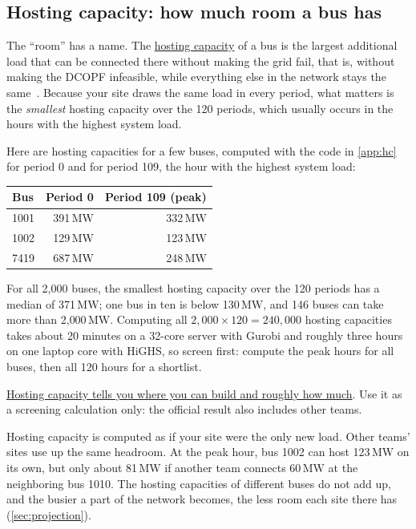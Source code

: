 \documentclass[10pt]{article}
\newcommand{\alert}[1]{{\color{alertblue}\uline{#1}}}
\newcommand{\MW}{\ensuremath{\,\mathrm{MW}}}
\begin{document}
\subsection{Hosting capacity: how much room a bus has}\label{sec:hc}
The ``room'' has a name. The \alert{hosting capacity} of a bus
is the largest additional load that can be connected there without making the
grid fail, that is, without making the DCOPF infeasible, while everything else
in the network stays the same~\cite{bollen2011integration,wan2026hosting}.
Because your site draws the same load in every period, what matters is the
\emph{smallest} hosting capacity over the 120 periods, which usually occurs in
the hours with the highest system load.

Here are hosting capacities for a few buses, computed with the code in
\cref{app:hc} for period 0 and for period 109, the hour with the highest system
load:

\begin{center}
\small
\begin{tabular}{@{}l r r@{}}
\toprule
Bus & Period 0 & Period 109 (peak)\\
\midrule
1001 & 391\MW & 332\MW\\
1002 & 129\MW & 123\MW\\
7419 & 687\MW & 248\MW\\
\bottomrule
\end{tabular}
\end{center}
For all 2{,}000 buses, the smallest hosting capacity over the 120 periods has
a median of 371\MW; one bus in ten is below 130\MW, and 146 buses can take more
than 2{,}000\MW. Computing all $2{,}000 \times 120 = 240{,}000$ hosting
capacities takes about 20 minutes on a 32-core server with Gurobi and roughly
three hours on one laptop core with HiGHS, so screen first: compute the peak
hours for all buses, then all 120 hours for a shortlist.

\alert{Hosting capacity tells you where you can build and roughly how much}.
Use it as a screening calculation only: the official result
also includes other teams.

\begin{warningbox}
Hosting capacity is computed as if your site were the only new load. Other
teams' sites use up the same headroom. At the peak hour, bus 1002 can host
123\MW{} on its own, but only about 81\MW{} if another team connects 60\MW{} at
the neighboring bus 1010. The hosting capacities of different buses do not add up,
and the busier a part of the network becomes, the less room each site there
has (\cref{sec:projection}).
\end{warningbox}
\end{document}
